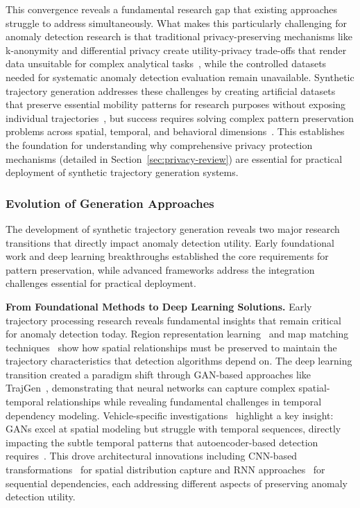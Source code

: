 \documentclass[runningheads]{llncs}
\begin{document}
This convergence reveals a fundamental research gap that existing approaches struggle to address simultaneously. What makes this particularly challenging for anomaly detection research is that traditional privacy-preserving mechanisms like k-anonymity and differential privacy create utility-privacy trade-offs that render data unsuitable for complex analytical tasks~\cite{jordon2019pate}, while the controlled datasets needed for systematic anomaly detection evaluation remain unavailable. Synthetic trajectory generation addresses these challenges by creating artificial datasets that preserve essential mobility patterns for research purposes without exposing individual trajectories~\cite{cao2021generating}, but success requires solving complex pattern preservation problems across spatial, temporal, and behavioral dimensions~\cite{kong2023mobility,merhi2024synthetic}. This establishes the foundation for understanding why comprehensive privacy protection mechanisms (detailed in Section~\ref{sec:privacy-review}) are essential for practical deployment of synthetic trajectory generation systems.

\subsubsection{Evolution of Generation Approaches}

The development of synthetic trajectory generation reveals two major research transitions that directly impact anomaly detection utility. Early foundational work and deep learning breakthroughs established the core requirements for pattern preservation, while advanced frameworks address the integration challenges essential for practical deployment.

\textbf{From Foundational Methods to Deep Learning Solutions.} Early trajectory processing research reveals fundamental insights that remain critical for anomaly detection today. Region representation learning~\cite{wang2017region} and map matching techniques~\cite{newson2009hidden} show how spatial relationships must be preserved to maintain the trajectory characteristics that detection algorithms depend on. The deep learning transition created a paradigm shift through GAN-based approaches like TrajGen~\cite{cao2021generating}, demonstrating that neural networks can capture complex spatial-temporal relationships while revealing fundamental challenges in temporal dependency modeling. Vehicle-specific investigations~\cite{bajarunas2022generative} highlight a key insight: GANs excel at spatial modeling but struggle with temporal sequences, directly impacting the subtle temporal patterns that autoencoder-based detection requires~\cite{huang2021lstm}. This drove architectural innovations including CNN-based transformations~\cite{merhi2024synthetic} for spatial distribution capture and RNN approaches~\cite{du2016recurrent} for sequential dependencies, each addressing different aspects of preserving anomaly detection utility.
\end{document}
